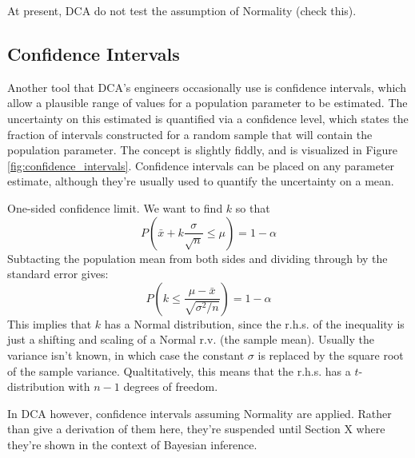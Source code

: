 \documentclass[11pt,a4paper,article]{memoir} %
\begin{document}
At present, DCA do not test the assumption of Normality (check this).
\par
\subsection*{Confidence Intervals}
Another tool that DCA's engineers occasionally use is confidence intervals, which allow a plausible range of values for a population parameter to be estimated. The uncertainty on this estimated is quantified via a confidence level, which states the fraction of intervals constructed for a random sample that will contain the population parameter. The concept is slightly fiddly, and is visualized in Figure \ref{fig:confidence_intervals}. Confidence intervals can be placed on any parameter estimate, although they're usually used to quantify the uncertainty on a mean. 
\par
One-sided confidence limit. 
We want to find $k$ so that
\[
	P(\bar{x} + k\frac{\sigma}{\sqrt{n}} \leq \mu) = 1 - \alpha
\]
Subtacting the population mean from both sides and dividing through by the standard error gives:
\[
	P(k \leq \frac{\mu - \bar{x}}{\sqrt{\sigma^2/n}}) = 1 - \alpha
\]
This implies that $k$ has a Normal distribution, since the r.h.s. of the inequality is just a shifting and scaling of a Normal r.v. (the sample mean). Usually the variance isn't known, in which case the constant $\sigma$ is replaced by the square root of the sample variance. Qualtitatively, this means that the r.h.s. has a $t$-distribution with $n - 1$ degrees of freedom.

 In DCA however, confidence intervals assuming Normality are applied. Rather than give a derivation of them here, they're suspended until Section X where they're shown in the context of Bayesian inference.
\end{document}
